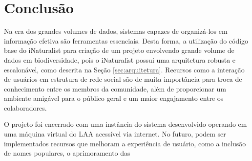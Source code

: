 \section{Conclusão}
Na era dos grandes volumes de dados, sistemas capazes de organizá-los em informação efetiva são ferramentas essenciais. Desta forma, a utilização do código base do iNaturalist para criação de um projeto envolvendo grande volume de dados em biodiversidade, pois o iNaturalist possui uma arquitetura  robusta e escalonável, como descrita na Seção \ref{sec:arquitetura}. Recursos como a interação de usuários em estrutura de rede social são de muita importância para troca de conhecimento entre os membros da comunidade, além de proporcionar um ambiente amigável para o público geral e um maior  engajamento entre os colaboradores.

O projeto foi encerrado com uma instância do sistema desenvolvido operando em uma máquina virtual do LAA acessível via internet. No futuro, podem ser implementados recursos que melhoram a experiência de usuário, como a inclusão de nomes populares, o aprimoramento das



